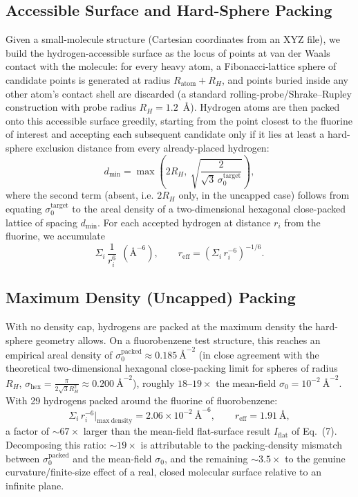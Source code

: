 \documentclass[11pt]{article}
\begin{document}
\subsection{Accessible Surface and Hard-Sphere Packing}
Given a small-molecule structure (Cartesian coordinates from an XYZ file), we build the hydrogen-accessible surface as the locus of points at van der Waals contact with the molecule: for every heavy atom, a Fibonacci-lattice sphere of candidate points is generated at radius $R_{\mathrm{atom}} + R_H$, and points buried inside any other atom's contact shell are discarded (a standard rolling-probe/Shrake--Rupley construction with probe radius $R_H = 1.2$~\AA). Hydrogen atoms are then packed onto this accessible surface greedily, starting from the point closest to the fluorine of interest and accepting each subsequent candidate only if it lies at least a hard-sphere exclusion distance from every already-placed hydrogen:
\begin{equation}
d_{\mathrm{min}} = \max\!\left(2R_H,\ \sqrt{\dfrac{2}{\sqrt{3}\,\sigma_0^{\mathrm{target}}}}\right),
\end{equation}
where the second term (absent, i.e. $2R_H$ only, in the uncapped case) follows from equating $\sigma_0^{\mathrm{target}}$ to the areal density of a two-dimensional hexagonal close-packed lattice of spacing $d_{\mathrm{min}}$. For each accepted hydrogen at distance $r_i$ from the fluorine, we accumulate
\begin{equation}
\Sigma_i\, \frac{1}{r_i^6}\ \ (\text{\AA}^{-6}), \qquad r_{\mathrm{eff}} = \left(\Sigma_i\, r_i^{-6}\right)^{-1/6}.
\end{equation}

\subsection{Maximum Density (Uncapped) Packing}
With no density cap, hydrogens are packed at the maximum density the hard-sphere geometry allows. On a fluorobenzene test structure, this reaches an empirical areal density of $\sigma_0^{\mathrm{packed}} \approx 0.185~\text{\AA}^{-2}$ (in close agreement with the theoretical two-dimensional hexagonal close-packing limit for spheres of radius $R_H$, $\sigma_{\mathrm{hex}} = \frac{\pi}{2\sqrt{3}R_H^2} \approx 0.200~\text{\AA}^{-2}$), roughly $18$--$19\times$ the mean-field $\sigma_0 = 10^{-2}~\text{\AA}^{-2}$. With 29 hydrogens packed around the fluorine of fluorobenzene:
\begin{equation}
\Sigma_i\, r_i^{-6}\big|_{\mathrm{max\ density}} = 2.06\times 10^{-2}~\text{\AA}^{-6}, \qquad r_{\mathrm{eff}} = 1.91~\text{\AA},
\end{equation}
a factor of $\sim\!67\times$ larger than the mean-field flat-surface result $I_{\mathrm{flat}}$ of Eq.~(7). Decomposing this ratio: $\sim\!19\times$ is attributable to the packing-density mismatch between $\sigma_0^{\mathrm{packed}}$ and the mean-field $\sigma_0$, and the remaining $\sim\!3.5\times$ to the genuine curvature/finite-size effect of a real, closed molecular surface relative to an infinite plane.
\end{document}
